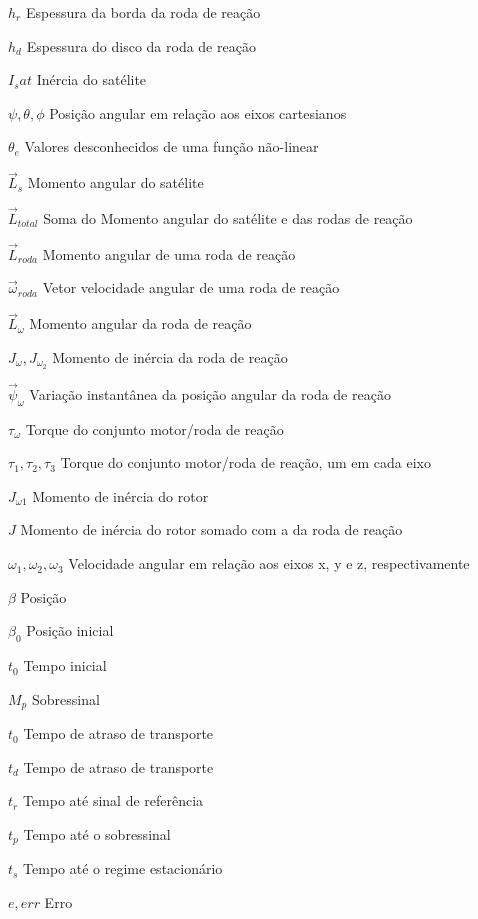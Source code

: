 \begin{simbolos}
  \item[$h_{r}$] Espessura da borda da roda de reação
  \item[$h_{d}$] Espessura do disco da roda de reação
  \item[$I_sat$] Inércia do satélite
  \item[$\psi, \theta, \phi$] Posição angular em relação aos eixos cartesianos
  \item[$\theta_e$] Valores desconhecidos de uma função não-linear
  \item[$\vec{L}_s$] Momento angular do satélite
  \item[$\vec{L}_{total}$] Soma do Momento angular do satélite e das rodas de reação
  \item[$\vec{L}_{roda}$] Momento angular de uma roda de reação
  \item[$\vec{\omega}_{roda}$] Vetor velocidade angular de uma roda de reação
  \item[$\vec{L}_{\omega}$] Momento angular da roda de reação
  \item[$J_{\omega}, J_{\omega_2}$] Momento de inércia da roda de reação
  \item[$\vec{\psi}_{\omega}$] Variação instantânea da posição angular da roda de reação
  \item[$\tau_{\omega}$] Torque do conjunto motor/roda de reação
  \item[$\tau_{1}, \tau_{2}, \tau_{3}$] Torque do conjunto motor/roda de reação, um em cada eixo
  \item[$J_{\omega 1}$] Momento de inércia do rotor
  \item[$J$] Momento de inércia do rotor somado com a da roda de reação
  \item[$\omega_1, \omega_2, \omega_3$] Velocidade angular em relação aos eixos x, y e z, respectivamente
  \item[$\beta$] Posição
  \item[$\beta_0$] Posição inicial
  \item[$t_0$] Tempo inicial
  \item[$M_p$] Sobressinal
  \item[$t_0$] Tempo de atraso de transporte
  \item[$t_d$] Tempo de atraso de transporte
  \item[$t_r$] Tempo até sinal de referência
  \item[$t_p$] Tempo até o sobressinal
  \item[$t_s$] Tempo até o regime estacionário
  \item[$e,err$] Erro

\end{simbolos}
